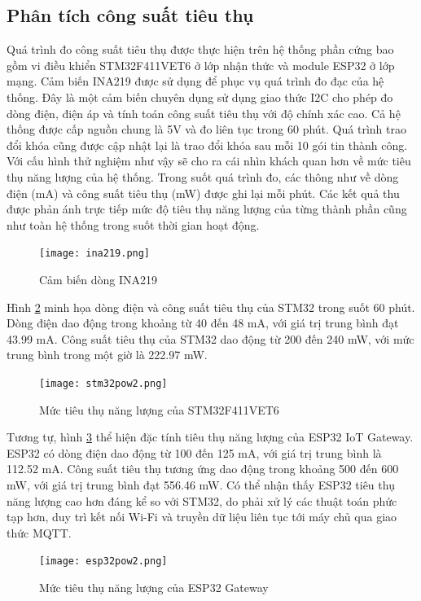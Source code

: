 \subsection{Phân tích công suất tiêu thụ}
Quá trình đo công suất tiêu thụ được thực hiện trên hệ thống phần cứng bao gồm vi điều khiển STM32F411VET6 ở lớp nhận thức và module ESP32 ở lớp mạng.
Cảm biến INA219 được sử dụng để phục vụ quá trình đo đạc của hệ thống. Đây là một cảm biến chuyên dụng sử dụng giao thức I2C cho phép
đo dòng điện, điện áp và tính toán công suất tiêu thụ với độ chính xác cao. Cả hệ thống được cấp nguồn chung là 5V và đo liên tục trong 60 phút. Quá trình trao đổi khóa cũng được cập nhật lại là trao đổi khóa sau mỗi 10 gói tin thành công.
Với cấu hình thử nghiệm như vậy sẽ cho ra cái nhìn khách quan hơn về mức tiêu thụ năng lượng của hệ thống.
Trong suốt quá trình đo, các thông như về dòng điện (mA) và công suất tiêu thụ (mW) được ghi lại mỗi phút. 
Các kết quả thu được phản ánh trực tiếp mức độ tiêu thụ năng lượng của từng thành phần cũng như toàn hệ thống trong suốt thời gian hoạt động.
\begin{figure}[H]
    \centering
    \texttt{[image: ina219.png]}
    \caption{Cảm biến dòng INA219}
    \label{fig:ina219}
\end{figure}

Hình \ref{fig:stm32pow} minh họa dòng điện và công suất tiêu thụ của STM32 trong suốt 60 phút. Dòng điện dao động trong khoảng từ 40 đến 48 mA, với giá trị trung bình đạt 43.99 mA. Công suất tiêu thụ của STM32 dao động từ 200 đến 240 mW, với mức trung bình trong một giờ là 222.97 mW.
\begin{figure}[H]
    \centering
    \texttt{[image: stm32pow2.png]}
    \caption{Mức tiêu thụ năng lượng của STM32F411VET6}
    \label{fig:stm32pow}
\end{figure}

Tương tự, hình \ref{fig:esp32pow} thể hiện đặc tính tiêu thụ năng lượng của ESP32 IoT Gateway. ESP32 có dòng điện dao động từ 100 đến 125 mA, với giá trị trung bình là 112.52 mA. 
Công suất tiêu thụ tương ứng dao động trong khoảng 500 đến 600 mW, với giá trị trung bình đạt 556.46 mW. 
Có thể nhận thấy ESP32 tiêu thụ năng lượng cao hơn đáng kể so với STM32, do phải xử lý các thuật toán phức tạp hơn, duy trì kết nối Wi-Fi và truyền dữ liệu liên tục tới máy chủ qua giao thức MQTT.

\begin{figure}[H]
    \centering
    \texttt{[image: esp32pow2.png]}
    \caption{Mức tiêu thụ năng lượng của ESP32 Gateway}
    \label{fig:esp32pow}
\end{figure}


